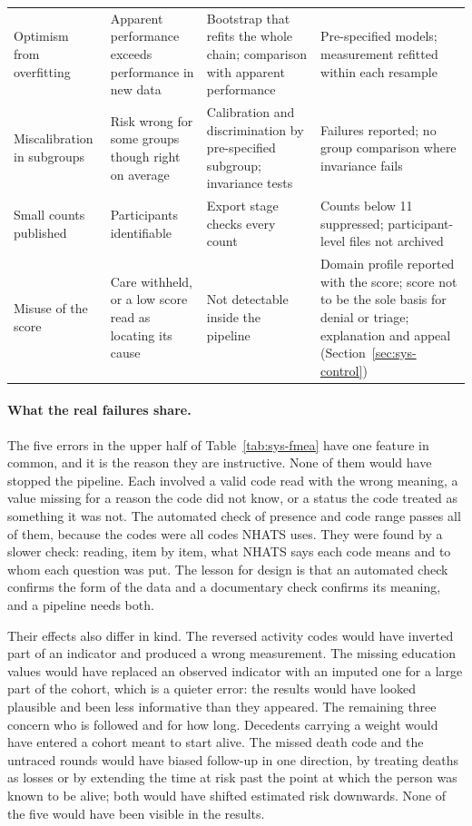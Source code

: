 {\begin{longtable}{p{3.2cm} p{3.6cm} p{3.4cm} p{3.6cm}}
\addlinespace
Optimism from overfitting & Apparent performance exceeds performance in new data & Bootstrap that refits the whole chain; comparison with apparent performance & Pre-specified models; measurement refitted within each resample \\
\addlinespace
Miscalibration in subgroups & Risk wrong for some groups though right on average & Calibration and discrimination by pre-specified subgroup; invariance tests & Failures reported; no group comparison where invariance fails \\
\addlinespace
Small counts published & Participants identifiable & Export stage checks every count & Counts below 11 suppressed; participant-level files not archived \\
\addlinespace
Misuse of the score & Care withheld, or a low score read as locating its cause & Not detectable inside the pipeline & Domain profile reported with the score; score not to be the sole basis for denial or triage; explanation and appeal (Section~\ref{sec:sys-control}) \\
\bottomrule
\end{longtable}
}

\paragraph{What the real failures share.} The five errors in the upper half of
Table~\ref{tab:sys-fmea} have one feature in common, and it is the reason they
are instructive. None of them would have stopped the pipeline. Each involved a
valid code read with the wrong meaning, a value missing for a reason the code
did not know, or a status the code treated as something it was not. The
automated check of presence and code range passes all of them, because the
codes were all codes NHATS uses. They were found by a slower check: reading,
item by item, what NHATS says each code means and to whom each question was
put. The lesson for design is that an automated check confirms the form of the
data and a documentary check confirms its meaning, and a pipeline needs both.

Their effects also differ in kind. The reversed activity codes would have
inverted part of an indicator and produced a wrong measurement. The missing
education values would have replaced an observed indicator with an imputed one
for a large part of the cohort, which is a quieter error: the results would
have looked plausible and been less informative than they appeared. The
remaining three concern who is followed and for how long. Decedents carrying a
weight would have entered a cohort meant to start alive. The missed death code
and the untraced rounds would have biased follow-up in one direction, by
treating deaths as losses or by extending the time at risk past the point at
which the person was known to be alive; both would have shifted estimated risk
downwards. None of the five would have been visible in the results.

